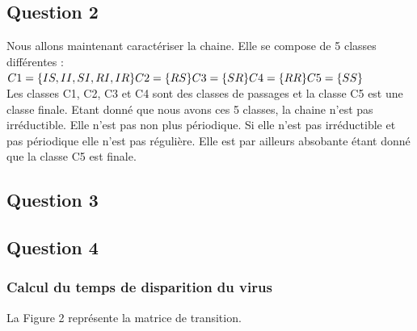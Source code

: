 \documentclass[a4paper, 11pt, oneside]{article}
\begin{document}
\subsection{Question 2}

Nous allons maintenant caractériser la chaine. 
Elle se compose de 5 classes différentes :
$C1 = \{IS, II, SI, RI, IR\}
\\C2 = \{RS\}
\\C3 = \{SR\}
\\C4 = \{RR\}
\\C5 = \{SS\}$
\\Les classes C1, C2, C3 et C4 sont des classes de passages 
et la classe C5 est une classe finale.
Etant donné que nous avons ces 5 classes, la chaine n'est pas irréductible.
Elle n'est pas non plus périodique. Si elle n'est pas irréductible et pas périodique 
elle n'est pas régulière. Elle est par ailleurs absobante étant donné que la classe 
C5 est finale.

\subsection{Question 3}

\subsection{Question 4}
\subsubsection{Calcul du temps de disparition du virus}
La Figure 2 représente la matrice de transition.
\end{document}
